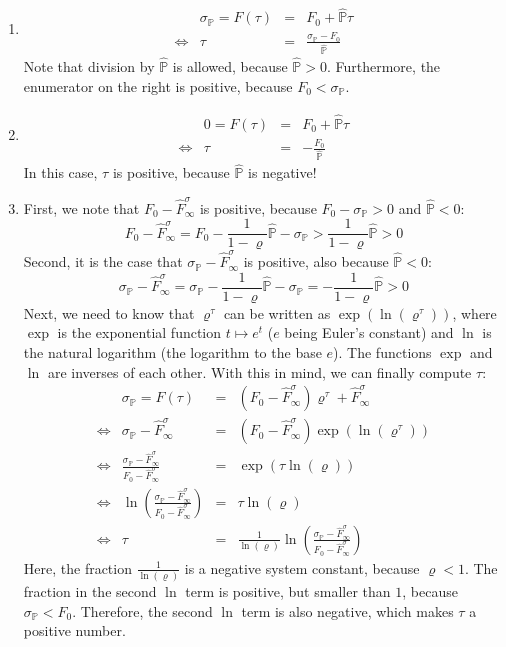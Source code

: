 \documentclass[a4paper,12pt]{scrartcl}
\begin{document}
\begin{enumerate}
 
 \item
 $$\begin{array}{rrcl}
    & \sigma_{\mathbb{P}} = F(\tau) & = &  F_0 + \hat{\mathbb{P}}\tau\\
  \Leftrightarrow & \tau & = &\frac{\sigma_{\mathbb{P}} - F_0}{\hat{\mathbb{P}}}
   \end{array}$$
 Note that division by $\hat{\mathbb{P}}$ is allowed, because $\hat{\mathbb{P}} > 0$. Furthermore, the enumerator on the right is positive, because $F_0 < \sigma_{\mathbb{P}}$.
 \item 
  $$\begin{array}{rrcl}
  & 0 = F(\tau) & = & F_0 + \hat{\mathbb{P}}\tau\\
 \Leftrightarrow & \tau & = & -\frac{F_0}{\hat{\mathbb{P}}}
   \end{array}$$
 In this case, $\tau$ is positive, because $\hat{\mathbb{P}}$ is negative!
 \item First, we note that $F_0 - \hat{F}^{\sigma}_{\infty}$ is positive, because $F_0 - \sigma_{\mathbb{P}} > 0$ and $\hat{\mathbb{P}} < 0$:
 $$F_0 - \hat{F}^{\sigma}_{\infty} = F_0 - \frac{1}{1-\varrho} \hat{\mathbb{P}} - \sigma_{\mathbb{P}} > \frac{1}{1-\varrho} \hat{\mathbb{P}} > 0$$
 Second, it is the case that $\sigma_{\mathbb{P}} - \hat{F}^{\sigma}_{\infty}$ is positive, also because $\hat{\mathbb{P}} < 0$:
 $$\sigma_{\mathbb{P}} - \hat{F}^{\sigma}_{\infty} = \sigma_{\mathbb{P}} - \frac{1}{1-\varrho} \hat{\mathbb{P}} - \sigma_{\mathbb{P}} = - \frac{1}{1-\varrho} \hat{\mathbb{P}} > 0$$
 Next, we need to know that $\varrho^{\tau}$ can be written as $\exp(\ln(\varrho^{\tau}))$, where $\exp$ is the exponential function $t \mapsto e^t$ ($e$ being Euler's constant) and $\ln$ is the natural logarithm (the logarithm to the base $e$). The functions $\exp$ and $\ln$ are inverses of each other. With this in mind, we can finally compute $\tau$:
 $$\begin{array}{rrcl}
  & \sigma_{\mathbb{P}} = F(\tau) & = & (F_0-\hat{F}^{\sigma}_{\infty}) \varrho^{\tau} + \hat{F}^{\sigma}_{\infty}\\
  \Leftrightarrow & \sigma_{\mathbb{P}} - \hat{F}^{\sigma}_{\infty} & = & (F_0-\hat{F}^{\sigma}_{\infty}) \exp(\ln(\varrho^{\tau}))\\
  \Leftrightarrow & \frac{\sigma_{\mathbb{P}} - \hat{F}^{\sigma}_{\infty}}{F_0-\hat{F}^{\sigma}_{\infty}} & = & \exp({\tau}\ln(\varrho))\\
  \Leftrightarrow & \ln \left( \frac{\sigma_{\mathbb{P}} - \hat{F}^{\sigma}_{\infty}}{F_0-\hat{F}^{\sigma}_{\infty}} \right) & = & \tau\ln(\varrho)\\
  \Leftrightarrow & \tau & = & \frac{1}{\ln(\varrho)} \ln \left( \frac{\sigma_{\mathbb{P}} - \hat{F}^{\sigma}_{\infty}}{F_0-\hat{F}^{\sigma}_{\infty}} \right)
 \end{array}$$
Here, the fraction $\frac{1}{\ln(\varrho)}$ is a negative system constant, because $\varrho < 1$. The fraction in the second $\ln$ term is positive, but smaller than $1$, because $\sigma_{\mathbb{P}} < F_0$. Therefore, the second $\ln$ term is also negative, which makes $\tau$ a positive number.
\end{enumerate}
\end{document}
